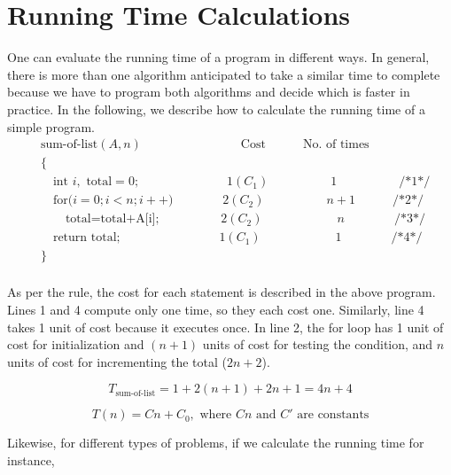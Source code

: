 \documentclass{article}
\begin{document}
\section{Running Time Calculations}

One can evaluate the running time of a program in different ways. In general, there is more than one algorithm anticipated to take a similar time to complete because we have to program both algorithms and decide which is faster in practice. In the following, we describe how to calculate the running time of a simple program.\cite{karunanithi2014survey}
\vspace{0.5cm} 
\[
\begin{aligned}
&\text{{sum-of-list}}(A,n)\quad\quad\quad\quad\quad\quad\quad\quad \text{{Cost}}\quad\quad\quad \text{{No. of times}} \\
&\{ \\
&\quad \text{{int }} i, \text{{ total}}=0;\quad\quad\quad\quad\quad\quad\quad 1(C_1) \quad\quad\quad\quad\quad 1 \quad\quad\quad\quad\quad \text{{/*1*/}} \\
&\quad\text{{for(}}i=0;i<n;i++) \quad\quad\quad\quad 2(C_2) \quad\quad\quad\quad\quad n+1 \quad\quad\quad \text{{/*2*/}} \\
&\quad \quad \text{{total=total+A[i];}} \quad\quad\quad\quad\quad 2(C_2) \quad\quad\quad\quad\quad\quad n \quad\quad\quad\quad \text{{/*3*/}} \\
&\quad \text{{return total;}} \quad\quad\quad\quad\quad\quad\quad\quad 1(C_1) \quad\quad\quad\quad\quad\quad 1 \quad\quad\quad\quad \text{{/*4*/}} \\
&\} \\
\end{aligned}
\]

\vspace{0.5cm} %
As per the rule, the cost for each statement is described in the above program. Lines 1 and 4 compute only one time, so they each cost one. Similarly, line 4 takes 1 unit of cost because it executes once. In line 2, the for loop has 1 unit of cost for initialization and $(n+1)$ units of cost for testing the condition, and $n$ units of cost for incrementing the total ($2n+2$).\cite{karunanithi2014survey}

\[
T_{\text{{sum-of-list}}} = 1 + 2(n + 1) + 2n + 1 = 4n + 4
\]

\[
T(n) = Cn + C_0, \text{{ where }} Cn \text{{ and }} C' \text{{ are constants}}
\]

\vspace{0.5cm} %
Likewise, for different types of problems, if we calculate the running time for instance,
\end{document}
